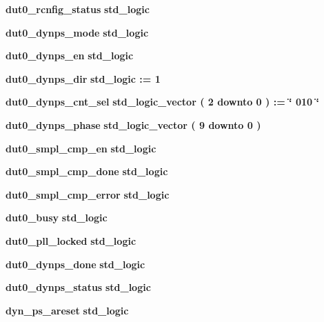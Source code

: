 \begin{DoxyCompactItemize}
\item 
{\bf dut0\+\_\+rcnfig\+\_\+status} {\bfseries \textcolor{comment}{std\+\_\+logic}\textcolor{vhdlchar}{ }} 
\item 
{\bf dut0\+\_\+dynps\+\_\+mode} {\bfseries \textcolor{comment}{std\+\_\+logic}\textcolor{vhdlchar}{ }} 
\item 
{\bf dut0\+\_\+dynps\+\_\+en} {\bfseries \textcolor{comment}{std\+\_\+logic}\textcolor{vhdlchar}{ }} 
\item 
{\bf dut0\+\_\+dynps\+\_\+dir} {\bfseries \textcolor{comment}{std\+\_\+logic}\textcolor{vhdlchar}{ }\textcolor{vhdlchar}{ }\textcolor{vhdlchar}{\+:}\textcolor{vhdlchar}{=}\textcolor{vhdlchar}{ }\textcolor{vhdlchar}{ }\textcolor{vhdlchar}{\textquotesingle{}}\textcolor{vhdlchar}{ } \textcolor{vhdldigit}{1} \textcolor{vhdlchar}{ }\textcolor{vhdlchar}{\textquotesingle{}}\textcolor{vhdlchar}{ }} 
\item 
{\bf dut0\+\_\+dynps\+\_\+cnt\+\_\+sel} {\bfseries \textcolor{comment}{std\+\_\+logic\+\_\+vector}\textcolor{vhdlchar}{ }\textcolor{vhdlchar}{(}\textcolor{vhdlchar}{ }\textcolor{vhdlchar}{ } \textcolor{vhdldigit}{2} \textcolor{vhdlchar}{ }\textcolor{keywordflow}{downto}\textcolor{vhdlchar}{ }\textcolor{vhdlchar}{ } \textcolor{vhdldigit}{0} \textcolor{vhdlchar}{ }\textcolor{vhdlchar}{)}\textcolor{vhdlchar}{ }\textcolor{vhdlchar}{ }\textcolor{vhdlchar}{ }\textcolor{vhdlchar}{\+:}\textcolor{vhdlchar}{=}\textcolor{vhdlchar}{ }\textcolor{vhdlchar}{ }\textcolor{vhdlchar}{ }\textcolor{vhdlchar}{ }\textcolor{keyword}{\char`\"{} 010 \char`\"{}}\textcolor{vhdlchar}{ }} 
\item 
{\bf dut0\+\_\+dynps\+\_\+phase} {\bfseries \textcolor{comment}{std\+\_\+logic\+\_\+vector}\textcolor{vhdlchar}{ }\textcolor{vhdlchar}{(}\textcolor{vhdlchar}{ }\textcolor{vhdlchar}{ } \textcolor{vhdldigit}{9} \textcolor{vhdlchar}{ }\textcolor{keywordflow}{downto}\textcolor{vhdlchar}{ }\textcolor{vhdlchar}{ } \textcolor{vhdldigit}{0} \textcolor{vhdlchar}{ }\textcolor{vhdlchar}{)}\textcolor{vhdlchar}{ }} 
\item 
{\bf dut0\+\_\+smpl\+\_\+cmp\+\_\+en} {\bfseries \textcolor{comment}{std\+\_\+logic}\textcolor{vhdlchar}{ }} 
\item 
{\bf dut0\+\_\+smpl\+\_\+cmp\+\_\+done} {\bfseries \textcolor{comment}{std\+\_\+logic}\textcolor{vhdlchar}{ }} 
\item 
{\bf dut0\+\_\+smpl\+\_\+cmp\+\_\+error} {\bfseries \textcolor{comment}{std\+\_\+logic}\textcolor{vhdlchar}{ }} 
\item 
{\bf dut0\+\_\+busy} {\bfseries \textcolor{comment}{std\+\_\+logic}\textcolor{vhdlchar}{ }} 
\item 
{\bf dut0\+\_\+pll\+\_\+locked} {\bfseries \textcolor{comment}{std\+\_\+logic}\textcolor{vhdlchar}{ }} 
\item 
{\bf dut0\+\_\+dynps\+\_\+done} {\bfseries \textcolor{comment}{std\+\_\+logic}\textcolor{vhdlchar}{ }} 
\item 
{\bf dut0\+\_\+dynps\+\_\+status} {\bfseries \textcolor{comment}{std\+\_\+logic}\textcolor{vhdlchar}{ }} 
\item 
{\bf dyn\+\_\+ps\+\_\+areset} {\bfseries \textcolor{comment}{std\+\_\+logic}\textcolor{vhdlchar}{ }} 
\end{DoxyCompactItemize}
